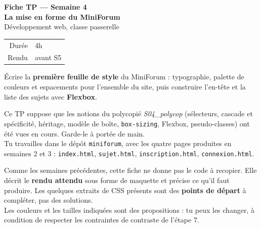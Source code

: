\documentclass[a4paper,11pt]{article}
\begin{document}

\begin{tcolorbox}[
  colback=accentBlue, colframe=accentBlue,
  arc=4pt, left=12pt, right=12pt, top=10pt, bottom=10pt]
  \begin{minipage}{0.72\linewidth}
    {\color{cfptYellow}\Large\bfseries Fiche TP --- Semaine 4}\\[4pt]
    {\color{white}\Large\bfseries La mise en forme du MiniForum}\\[4pt]
    {\color{lightBlue}\normalsize Développement web, classe passerelle}
  \end{minipage}
  \hfill
  \begin{minipage}{0.24\linewidth}
    \raggedleft
    \begin{tabular}{rl}
      \color{lightBlue}\small Durée & \color{white}\small 4h \\
      \color{lightBlue}\small Rendu & \color{white}\small avant S5 \\
    \end{tabular}
  \end{minipage}
\end{tcolorbox}

\vspace{6pt}
\begin{tcolorbox}[definition, title={Objectif du TP}]
Écrire la \textbf{première feuille de style} du MiniForum : typographie, palette de couleurs et espacements pour l'ensemble du site, puis construire l'en-tête et la liste des sujets avec \textbf{Flexbox}.
\end{tcolorbox}

\begin{tcolorbox}[astuce, title={Avant de commencer}]
Ce TP suppose que les notions du polycopié \textit{S04\_polycop} (sélecteurs, cascade et spécificité, héritage, modèle de boîte, \texttt{box-sizing}, Flexbox, pseudo-classes) ont été vues en cours. Garde-le à portée de main.\\[3pt]
Tu travailles dans le dépôt \texttt{miniforum}, avec les quatre pages produites en semaines 2 et 3 : \texttt{index.html}, \texttt{sujet.html}, \texttt{inscription.html}, \texttt{connexion.html}.
\end{tcolorbox}

\vspace{4pt}
\begin{tcolorbox}[attention, title={Comment lire cette fiche}]
Comme les semaines précédentes, cette fiche ne donne pas le code à recopier. Elle décrit le \textbf{rendu attendu} sous forme de maquette et précise ce qu'il faut produire. Les quelques extraits de CSS présents sont des \textbf{points de départ} à compléter, pas des solutions.\\[4pt]
Les couleurs et les tailles indiquées sont des propositions : tu peux les changer, à condition de respecter les contraintes de contraste de l'étape 7.
\end{tcolorbox}
\end{document}
